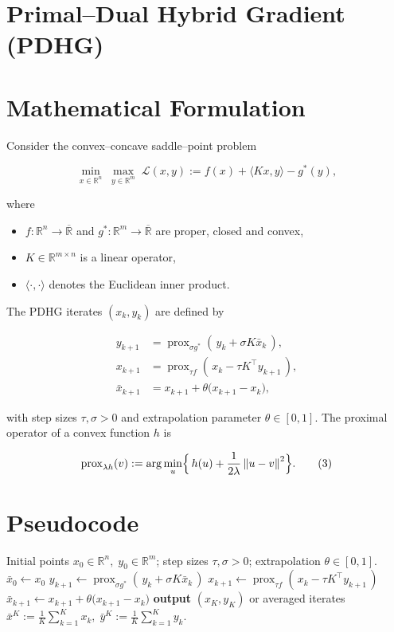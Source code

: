 \documentclass{article}
\newcommand{\prox}[2]{\operatorname{prox}_{#1}\!\left(#2\right)}
\newcommand{\norm}[1]{\left\|#1\right\|}
\begin{document}
\section*{Primal–Dual Hybrid Gradient (PDHG)}

\section*{Mathematical Formulation}
Consider the convex–concave saddle–point problem  

\[
\min_{x\in\mathbb R^{n}} \; \max_{y\in\mathbb R^{m}}
\; \mathcal L(x,y):= f(x)+\langle Kx,y\rangle-g^{*}(y),
\tag{1}
\]

where  

\begin{itemize}[nosep]
\item $f:\mathbb R^{n}\!\to\!\overline{\mathbb R}$ and $g^{*}:\mathbb R^{m}\!\to\!\overline{\mathbb R}$ are proper, closed and convex,
\item $K\in\mathbb R^{m\times n}$ is a linear operator,
\item $\langle\cdot,\cdot\rangle$ denotes the Euclidean inner product.
\end{itemize}

The PDHG iterates $(x_k,y_k)$ are defined by  

\[
\begin{aligned}
y_{k+1}&=\prox{\sigma g^{*}}{\,y_k+\sigma K\bar x_k\,},\\[4pt]
x_{k+1}&=\prox{\tau f}{\,x_k-\tau K^{\!\top}y_{k+1}\,},\\[4pt]
\bar x_{k+1}&=x_{k+1}+\theta\bigl(x_{k+1}-x_k\bigr),
\end{aligned}
\tag{2}
\]

with step sizes $\tau,\sigma>0$ and extrapolation parameter $\theta\in[0,1]$.  
The proximal operator of a convex function $h$ is  

\[
\prox{\lambda h}{v}:=\arg\min_{u}\Bigl\{\,h(u)+\frac{1}{2\lambda}\norm{u-v}^{2}\Bigr\}.
\tag{3}
\]

\section*{Pseudocode}
\begin{algorithm}[H]
\caption{Primal–Dual Hybrid Gradient}
\begin{algorithmic}[1]
\Require Initial points $x_{0}\in\mathbb R^{n},\;y_{0}\in\mathbb R^{m}$; step sizes $\tau,\sigma>0$; extrapolation $\theta\in[0,1]$.
\State $\bar x_{0}\gets x_{0}$
    \State $y_{k+1}\gets\prox{\sigma g^{*}}{\,y_{k}+\sigma K\bar x_{k}\,}$ \hfill{}
    \State $x_{k+1}\gets\prox{\tau f}{\,x_{k}-\tau K^{\!\top}y_{k+1}\,}$ \hfill{}
    \State $\bar x_{k+1}\gets x_{k+1}+\theta\bigl(x_{k+1}-x_{k}\bigr)$ \hfill{}
\EndFor
\State \textbf{output} $(x_{K},y_{K})$ or averaged iterates $\displaystyle \bar x^{K}:=\frac{1}{K}\sum_{k=1}^{K}x_{k},\;\bar y^{K}:=\frac{1}{K}\sum_{k=1}^{K}y_{k}$.
\end{algorithmic}
\end{algorithm}
\end{document}
